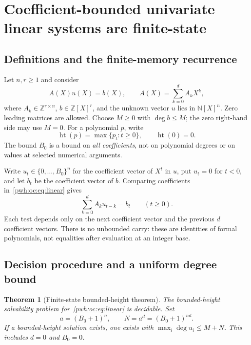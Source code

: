 \documentclass[11pt,letterpaper]{article}
\numberwithin{equation}{section}
\newtheorem{theorem}{Theorem}[section]
\theoremstyle{definition}
\newcommand{\N}{\mathbb N}
\newcommand{\Z}{\mathbb Z}
\newcommand{\htc}{\operatorname{ht}}
\begin{document}
\section{Coefficient-bounded univariate linear systems are finite-state}
\label{pwh:oc:sec:linear}

\subsection{Definitions and the finite-memory recurrence}

Let $n,r\ge1$ and consider
\begin{equation}
 A(X)u(X)=b(X),\qquad
 A(X)=\sum_{k=0}^{d}A_kX^k,
 \label{pwh:oc:eq:linear}
\end{equation}
where $A_k\in\Z^{r\times n}$, $b\in\Z[X]^r$, and the unknown vector
$u$ lies in $\N[X]^n$. Zero leading matrices are allowed. Choose
$M\ge0$ with $\deg b\le M$; the zero right-hand side may use $M=0$.
For a polynomial $p$, write
\[
 \htc(p)=\max\{p_t:t\ge0\},\qquad \htc(0)=0.
\]
The bound $B_0$ is a bound on \emph{all coefficients}, not on polynomial
degrees or on values at selected numerical arguments.

Write $u_t\in\{0,\ldots,B_0\}^n$ for the coefficient vector of $X^t$ in
$u$, put $u_t=0$ for $t<0$, and let $b_t$ be the coefficient vector of
$b$. Comparing coefficients in~\eqref{pwh:oc:eq:linear} gives
\begin{equation}
 \sum_{k=0}^{d}A_k u_{t-k}=b_t\qquad(t\ge0).
 \label{pwh:oc:eq:window}
\end{equation}
Each test depends only on the next coefficient vector and the previous
$d$ coefficient vectors. There is no unbounded carry: these are identities
of formal polynomials, not equalities after evaluation at an integer base.

\subsection{Decision procedure and a uniform degree bound}

\begin{theorem}[Finite-state bounded-height theorem]
\label{pwh:oc:thm:finite-state}
The bounded-height solvability problem for~\eqref{pwh:oc:eq:linear} is decidable.
Set
\[
 a=(B_0+1)^n,\qquad N=a^d=(B_0+1)^{nd}.
\]
If a bounded-height solution exists, one exists with
$\max_i\deg u_i\le M+N$. This includes $d=0$ and $B_0=0$.
\end{theorem}
\end{document}
